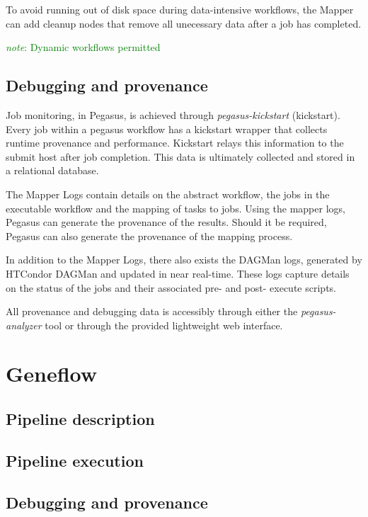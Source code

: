 \documentclass{report}
\newcommand{\note}[1]{\textcolor{green}{\textit{note}: #1}}
\begin{document}
        To avoid running out of disk space during data-intensive workflows, the Mapper can add cleanup nodes that remove all unecessary data after a job has completed.
 
        \note{Dynamic workflows permitted}

        \subsection{Debugging and provenance}
         Job monitoring, in Pegasus, is achieved through \textit{pegasus-kickstart} (kickstart). Every job within a pegasus workflow has a kickstart wrapper that collects runtime provenance
        and performance. Kickstart relays this information to the submit host after job completion. This data is ultimately collected and stored in a relational database.

        The Mapper Logs contain details on the abstract workflow, the jobs in the executable workflow 
        and the mapping of tasks to jobs. Using the mapper logs, Pegasus can generate the provenance of the results. Should it be required, Pegasus can also generate the provenance of the 
        mapping process.

        In addition to the Mapper Logs, there also exists the DAGMan logs, generated by HTCondor DAGMan and updated in near real-time. These logs capture details on the status of the jobs
        and their associated pre- and post- execute scripts.

        All provenance and debugging data is accessibly through either the \textit{pegasus-analyzer} tool or through the provided lightweight web interface.  
         
        

    \section{Geneflow}
        \subsection{Pipeline description}
        \subsection{Pipeline execution}
        \subsection{Debugging and provenance}
\end{document}

